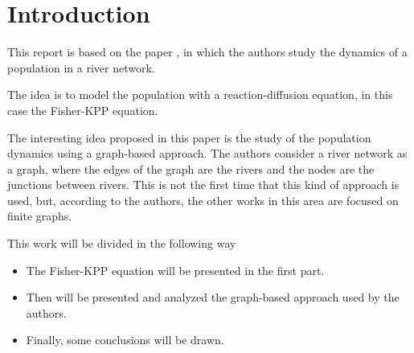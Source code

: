 \section{Introduction}
This report is based on the paper \cite{du2019fisherkpp}, in which the authors study the dynamics of a population in a river network.

The idea is to model the population with a reaction-diffusion equation, in this case the Fisher-KPP equation. 

The interesting idea proposed in this paper is the study of the population dynamics using a graph-based approach. The authors consider a river network as a graph, where the edges of the graph are the rivers and the nodes are the junctions between rivers. This is not the first time that this kind of approach is used, but, according to the authors, the other works in this area are focused on finite graphs.

This work will be divided in the following way
\begin{itemize}
    \item The Fisher-KPP equation will be presented in the first part.
    \item Then will be presented and analyzed the graph-based approach used by the authors.
    \item Finally, some conclusions will be drawn.
\end{itemize}

